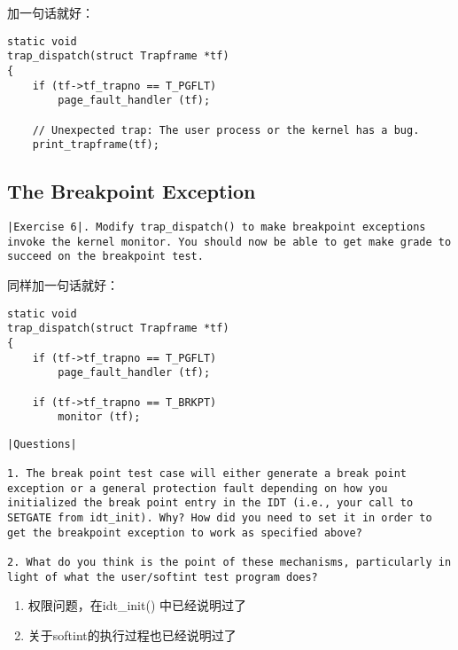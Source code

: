 \documentclass{article}
\newcommand{\funcname}[1]{{\ttfamily \small #1}}
\begin{document}
\begin{CJK*}{UTF8}{gkai}
加一句话就好：

\begin{lstlisting}[style=ccode, title={\scriptsize \ttfamily \bfseries kern/trap.c: trap\_dispatch()}]
static void
trap_dispatch(struct Trapframe *tf)
{
    if (tf->tf_trapno == T_PGFLT) 
        page_fault_handler (tf);
        
    // Unexpected trap: The user process or the kernel has a bug.
    print_trapframe(tf);
\end{lstlisting}


\subsection{The Breakpoint Exception}

\begin{lstlisting}[style=exercise]
|Exercise 6|. Modify trap_dispatch() to make breakpoint exceptions invoke the kernel monitor. You should now be able to get make grade to succeed on the breakpoint test.
\end{lstlisting}

同样加一句话就好：

\begin{lstlisting}[style=ccode, title={\scriptsize \ttfamily \bfseries kern/trap.c: trap\_dispatch()}]
static void
trap_dispatch(struct Trapframe *tf)
{
    if (tf->tf_trapno == T_PGFLT) 
        page_fault_handler (tf);

    if (tf->tf_trapno == T_BRKPT)
        monitor (tf);
\end{lstlisting}

\vspace{4em}

\begin{lstlisting}[style=exercise]
|Questions|

1. The break point test case will either generate a break point exception or a general protection fault depending on how you initialized the break point entry in the IDT (i.e., your call to SETGATE from idt_init). Why? How did you need to set it in order to get the breakpoint exception to work as specified above?

2. What do you think is the point of these mechanisms, particularly in light of what the user/softint test program does?
\end{lstlisting}

\begin{enumerate}
\item{权限问题，在\funcname{idt\_init()} 中已经说明过了}
\item{关于softint的执行过程也已经说明过了}
\end{enumerate}


\end{CJK*}
\end{document}
